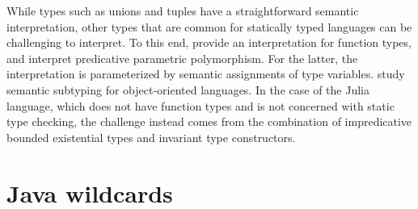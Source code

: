 While types such as unions and tuples have a straightforward
semantic interpretation, other types that are common for statically typed
languages can be challenging to interpret.
To this end, \citet{frisch:sem-sub:2002} provide an interpretation for
function types, and \citet{castagna:sem-poly:2011} interpret predicative
parametric polymorphism. For the latter, the interpretation is parameterized
by semantic assignments of type variables.
\citet{dardha:sem-sub-obj:2016, ancona:sem-sub-imp:2016} study semantic
subtyping for object-oriented languages.
In the case of the Julia language, which does not have function types and is not
concerned with static type checking, the challenge instead comes from the
combination of impredicative bounded existential types and invariant type
constructors.





\section{Java wildcards}

\TODO{}
